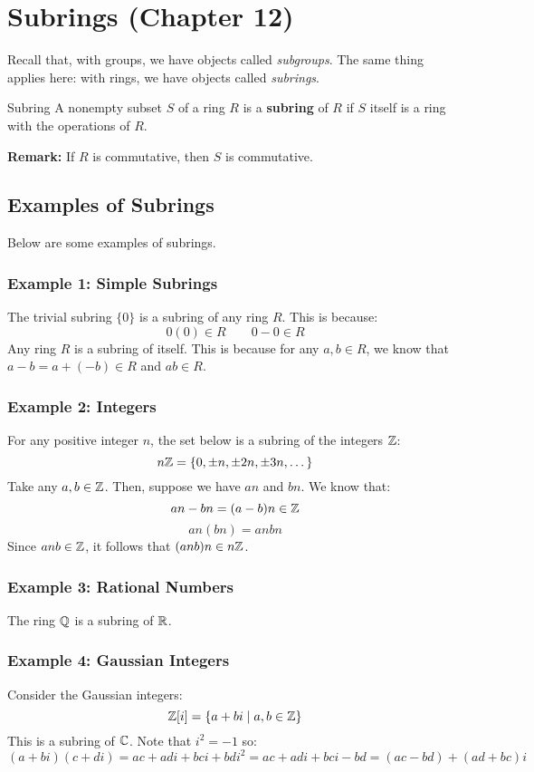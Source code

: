 \documentclass[letterpaper]{article}
\begin{document}
\newpage 
\section{Subrings (Chapter 12)}
Recall that, with groups, we have objects called \emph{subgroups}. The same thing applies here: with rings, we have objects called \emph{subrings}.
\begin{definition}{Subring}{}
    A nonempty subset $S$ of a ring $R$ is a \textbf{subring} of $R$ if $S$ itself is a ring with the operations of $R$.
\end{definition}
\textbf{Remark:} If $R$ is commutative, then $S$ is commutative.

\subsection{Examples of Subrings}
Below are some examples of subrings. 

\subsubsection{Example 1: Simple Subrings}
The trivial subring $\{0\}$ is a subring of any ring $R$. This is because:
\[0(0) \in R \qquad 0 - 0 \in R\]
Any ring $R$ is a subring of itself. This is because for any $a, b \in R$, we know that $a - b = a + (-b) \in R$ and $ab \in R$. 

\subsubsection{Example 2: Integers}
For any positive integer $n$, the set below is a subring of the integers $\mathbb{Z}$: 
\[n\mathbb{Z} = \{0, \pm n, \pm 2n, \pm 3n, \dots\}\]
Take any $a, b \in \mathbb{Z}$. Then, suppose we have $an$ and $bn$. We know that: 
\[an - bn = (a - b)n \in \mathbb{Z}\]
\[an(bn) = anbn\]
Since $anb \in \mathbb{Z}$, it follows that $(anb)n \in n\mathbb{Z}$. 

\subsubsection{Example 3: Rational Numbers}
The ring $\mathbb{Q}$ is a subring of $\mathbb{R}$. 


\subsubsection{Example 4: Gaussian Integers}
Consider the Gaussian integers:
\[\mathbb{Z}[i] = \{a + bi \mid a, b \in \mathbb{Z}\}\]
This is a subring of $\mathbb{C}$. Note that $i^2 = -1$ so:
\[(a + bi)(c + di) = ac + adi + bci + bdi^2 = ac + adi + bci - bd = (ac - bd) + (ad + bc)i\]
\end{document}
